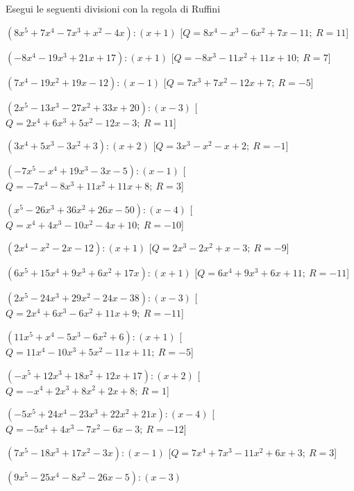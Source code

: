 \begin{esercizio}\label{ese:}
 Esegui le seguenti divisioni con la regola di Ruffini
 \begin{enumeratea}
  \item  \(\left(8 x^5 +7 x^4 -7 x^3 + x^2 -4 x  \right) : \left(x +1 \right)\)
   \hfill [\(Q = 8 x^4 - x^3 -6 x^2 +7 x -11;~R = 11\)]
  \item  \(\left(-8 x^4 -19 x^3 +21 x +17 \right) : \left(x +1 \right)\)
   \hfill [\(Q = -8 x^3 -11 x^2 +11 x +10;~R = 7\)]
  \item  \(\left(7 x^4 -19 x^2 +19 x -12 \right) : \left(x -1 \right)\)
   \hfill [\(Q = 7 x^3 +7 x^2 -12 x +7;~R = -5\)]
  \item  \(\left(2 x^5 -13 x^3 -27 x^2 +33 x +20 \right) : \left(x -3 \right)\)
   \hfill [\(Q = 2 x^4 +6 x^3 +5 x^2 -12 x -3;~R = 11\)]
  \item  \(\left(3 x^4 +5 x^3 -3 x^2 +3 \right) : \left(x +2 \right)\)
   \hfill [\(Q = 3 x^3 - x^2 - x +2;~R = -1\)]
  \item  \(\left(-7 x^5 - x^4 +19 x^3 -3 x -5 \right) : \left(x -1 \right)\)
   \hfill [\(Q = -7 x^4 -8 x^3 +11 x^2 +11 x +8;~R = 3\)]
  \item  \(\left(x^5 -26 x^3 +36 x^2 +26 x -50 \right) : \left(x -4 \right)\)
   \hfill [\(Q = x^4 +4 x^3 -10 x^2 -4 x +10;~R = -10\)]
  \item  \(\left(2 x^4 - x^2 -2 x -12 \right) : \left(x +1 \right)\)
   \hfill [\(Q = 2 x^3 -2 x^2 + x -3;~R = -9\)]
  \item  \(\left(6 x^5 +15 x^4 +9 x^3 +6 x^2 +17 x  \right) : \left(x +1 
\right)\)
   \hfill [\(Q = 6 x^4 +9 x^3 +6 x +11;~R = -11\)]
  \item  \(\left(2 x^5 -24 x^3 +29 x^2 -24 x -38 \right) : \left(x -3 \right)\)
   \hfill [\(Q = 2 x^4 +6 x^3 -6 x^2 +11 x +9;~R = -11\)]
  \item  \(\left(11 x^5 + x^4 -5 x^3 -6 x^2 +6 \right) : \left(x +1 \right)\)
   \hfill [\(Q = 11 x^4 -10 x^3 +5 x^2 -11 x +11;~R = -5\)]
  \item  \(\left(- x^5 +12 x^3 +18 x^2 +12 x +17 \right) : \left(x +2 \right)\)
   \hfill [\(Q = - x^4 +2 x^3 +8 x^2 +2 x +8;~R = 1\)]
  \item  \(\left(-5 x^5 +24 x^4 -23 x^3 +22 x^2 +21 x  \right) : \left(x -4 
\right)\)
   \hfill [\(Q = -5 x^4 +4 x^3 -7 x^2 -6 x -3;~R = -12\)]
  \item  \(\left(7 x^5 -18 x^3 +17 x^2 -3 x  \right) : \left(x -1 \right)\)
   \hfill [\(Q = 7 x^4 +7 x^3 -11 x^2 +6 x +3;~R = 3\)]
  \item  \(\left(9 x^5 -25 x^4 -8 x^2 -26 x -5 \right) : \left(x -3 \right)\)

\end{enumeratea}
\end{esercizio}
